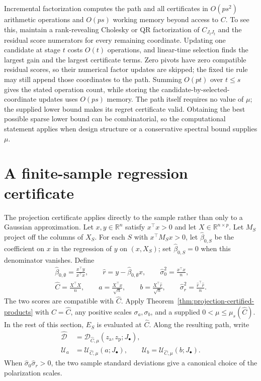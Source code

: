 \documentclass[a4paper,11pt,english]{article}
\newcommand{\R}{\mathbb R}
\begin{document}
Incremental factorization computes the path and all certificates in
$O(ps^2)$ arithmetic operations and $O(ps)$ working memory beyond access
to $C$.  To see this, maintain a rank-revealing Cholesky or QR
factorization of $C_{J_tJ_t}$ and the residual score numerators for every
remaining coordinate.  Updating one candidate at stage $t$ costs $O(t)$
operations, and linear-time selection finds the largest gain and the
largest certificate terms.  Zero pivots have zero compatible residual
scores, so their numerical factor updates are skipped; the fixed tie
rule may still append those coordinates to the path.  Summing $O(pt)$ over $t\le s$ gives the stated
operation count, while storing the candidate-by-selected-coordinate
updates uses $O(ps)$ memory.  The path itself requires no value of $\mu$; the supplied lower
bound makes its regret certificate valid.  Obtaining the best possible
sparse lower bound can be combinatorial, so the computational statement
applies when design structure or a conservative spectral bound supplies
$\mu$.

\section{A finite-sample regression certificate}

The projection certificate applies directly to the sample rather than
only to a Gaussian approximation.  Let $x,y\in\R^n$ satisfy
$x^\top x>0$ and let $X\in\R^{n\times p}$.  Let $M_S$ project off the
columns of $X_S$.  For each $S$ with $x^\top M_Sx>0$, let
$\hat\beta_{0,S}$ be the coefficient on $x$ in the regression of $y$ on
$(x,X_S)$; set $\hat\beta_{0,S}=0$ when this denominator vanishes.  Define
\begin{equation}\label{eq:empirical-objects}
\begin{gathered}
        \hat\beta_{0,\emptyset}=\frac{x^\top y}{x^\top x},
        \qquad
        \hat r=y-\hat\beta_{0,\emptyset}x,
        \qquad
        \hat\sigma_0^2=\frac{x^\top x}{n},\\
        \hat C=\frac{X^\top X}{n},
        \qquad
        a=\frac{X^\top x}{\sqrt n},
        \qquad
        b=\frac{X^\top\hat r}{\sqrt n},
        \qquad
        \hat\sigma_r^2=\frac{\hat r^\top\hat r}{n}.
\end{gathered}
\end{equation}
The two scores are compatible with $\hat C$.  Apply
Theorem~\ref{thm:projection-certified-products} with $C=\hat C$,
any positive scales $\sigma_a,\sigma_b$, and a supplied
$0<\mu\le\mu_s(\hat C)$.  In the rest of this section, $E_S$ is evaluated
at $\hat C$.  Along the resulting path, write
\begin{equation}\label{eq:sample-certificates}
\begin{split}
        \hat{\mathcal D}
        &=\mathcal D_{\hat C,\mu}(z_{\mathrm a},z_{\mathrm p};J_\bullet),\\
        \mathcal U_a&=\mathcal U_{\hat C,\mu}(a;J_\bullet),
        \qquad
        \mathcal U_b=\mathcal U_{\hat C,\mu}(b;J_\bullet).
\end{split}
\end{equation}
When $\hat\sigma_0\hat\sigma_r>0$, the two sample standard
deviations give a canonical choice of the polarization scales.
\end{document}
